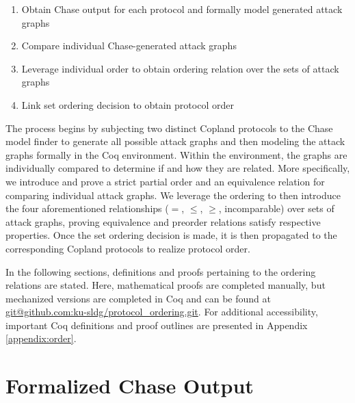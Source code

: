 \documentclass[runningheads]{llncs}
\theoremstyle{definition}
\newcommand{\squash}{\itemsep=0pt\parskip=0pt}
\begin{document}
\begin{enumerate}
    \squash
    \item Obtain Chase output for each protocol and formally model generated attack graphs
    \item Compare individual Chase-generated attack graphs
    \item Leverage individual order to obtain ordering relation over the sets of attack graphs
    \item Link set ordering decision to obtain protocol order
\end{enumerate}

\noindent The process begins by subjecting two distinct Copland protocols to the Chase model finder to generate all possible attack graphs and then modeling the attack graphs formally in the Coq environment. Within the environment, the graphs are individually compared to determine if and how they are related. More specifically, we introduce and prove a strict partial order and an equivalence relation for comparing individual attack graphs. We leverage the ordering to then introduce the four aforementioned relationships ($=$, $\leq$, $\geq$, incomparable) over sets of attack graphs, proving equivalence and preorder relations satisfy respective properties. Once the set ordering decision is made, it is then propagated to the corresponding Copland protocols to realize protocol order. 

In the following sections, definitions and proofs pertaining to the ordering relations are stated. Here, mathematical proofs are completed manually, but mechanized versions are completed in Coq and can be found at \url{git@github.com:ku-sldg/protocol_ordering.git}. For additional accessibility, important Coq definitions and proof outlines are presented in Appendix \ref{appendix:order}.


\section{Formalized Chase Output}
\end{document}
